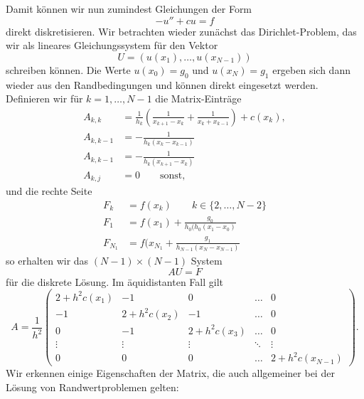Damit k\"onnen wir nun zumindest Gleichungen der Form 
$$ - u'' + c u = f $$
direkt diskretisieren. Wir betrachten wieder zun\"achst das Dirichlet-Problem, das wir als lineares Gleichungssystem f\"ur den Vektor
$$ U = (u(x_1),\ldots,u(x_{N-1})) $$ 
schreiben k\"onnen. Die Werte $u(x_0) = g_0$ und $u(x_N) = g_1$ ergeben sich dann wieder aus den Randbedingungen und k\"onnen direkt eingesetzt werden.  Definieren wir f\"ur $k=1,\ldots,N-1$ die Matrix-Eintr\"age  
\begin{align*}
A_{k,k} &= \frac{1}{h_k} \left( \frac{1}{x_{k+1}-x_k} +  \frac{1}{x_k+x_{k-1}} \right) + c(x_k), \\
A_{k,k-1} &= - \frac{1}{h_k(x_k - x_{k-1})} \\
A_{k,k-1} &= - \frac{1}{h_k(x_{k+1} - x_{k})} \\
A_{k,j} &= 0 \qquad \text{sonst, }
\end{align*}
und die rechte Seite
\begin{align*}
	F_k & =  f(x_k)  \qquad k \in \{2, \ldots,N-2\} \\
  F_1 & = f(x_1) + \frac{g_0}{h_0(h_0(x_1-x_0)}  \\
	F_{N_1} &= f(x_{N_1} + \frac{g_1}{h_{N-1}(x_N-x_{N-1})}
\end{align*}
so erhalten wir das $(N-1) \times (N-1)$ System
$$ A U  = F$$
f\"ur die diskrete L\"osung. Im \"aquidistanten Fall gilt
$$ A = \frac{1}{h^2} \left( \begin{array}{ccccc} 2 + h^2 c(x_1) & - 1 & 0 & \ldots & 0 \\
-1 & 2 + h^2 c(x_2)  & -1 & \ldots & 0 \\ 0 & -1 & 2 + h^2 c(x_3) & \ldots & 0 \\
\vdots & \vdots & \vdots & \ddots & \vdots \\
0 & 0 &0 & \ldots & 2 + h^2 c(x_{N-1})\end{array} \right). $$
Wir erkennen einige Eigenschaften der Matrix, die auch allgemeiner bei der L\"osung von Randwertproblemen gelten:
